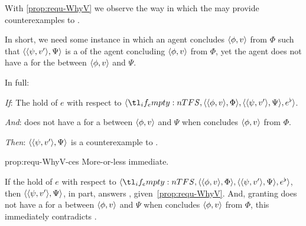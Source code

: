 \begin{note}
  With \autoref{prop:requ-WhyV} we observe the way in which the  may provide counterexamples to \issueConstraint{}.

  In short, we need some instance in which an agent concludes \(\langle \phi, v \rangle\) from \(\Phi\) such that \(\langle \langle \psi, v' \rangle, \Psi \rangle\) is a \requ{} of the agent concluding \(\langle \phi, v \rangle\) from \(\Phi\), yet the agent does not have a \wit{} for the \ros{} between \(\langle \phi, v \rangle\) and \(\Psi\).

  In full:

  \begin{proposition}
    \label{prop:requ-WhyV-ces}

    \begin{itenum}
    \item[\emph{If}:]
      The  hold of \(e\) with respect to \(\langle \vAgent{}, \pvp{\phi}{v}{\Phi}, \pvp{\psi}{v'}{\Psi}, e^{\flat} \rangle\).
    \item[\emph{And}:]
      \label{prop:requ-WhyVCes:noW}
      \vAgent{} does not have a \wit{} for a \ros{} between \(\langle \phi, v \rangle\) and \(\Psi\) when \vAgent{} concludes \(\langle \phi, v \rangle\) from \(\Phi\).
    \item[\emph{Then}:]
      \(\langle \langle \psi, v' \rangle, \Psi \rangle\) is a counterexample to \issueConstraint{}.
    \end{itenum}
    \vspace{-\baselineskip}
  \end{proposition}

  \begin{argument}{prop:requ-WhyV-ces}
    More-or-less immediate.

    If the  hold of \(e\) with respect to \(\langle \vAgent{}, \pvp{\phi}{v}{\Phi}, \pvp{\psi}{v'}{\Psi}, e^{\flat} \rangle\), then \(\langle \langle \psi, v' \rangle, \Psi \rangle\), in part, answers \qWhyV{}, given~\autoref{prop:requ-WhyV}.
    And, granting \vAgent{} does not have a \wit{} for a \ros{} between \(\langle \phi, v \rangle\) and \(\Psi\) when \vAgent{} concludes \(\langle \phi, v \rangle\) from \(\Phi\), this immediately contradicts \issueConstraint{}.
  \end{argument}
\end{note}

